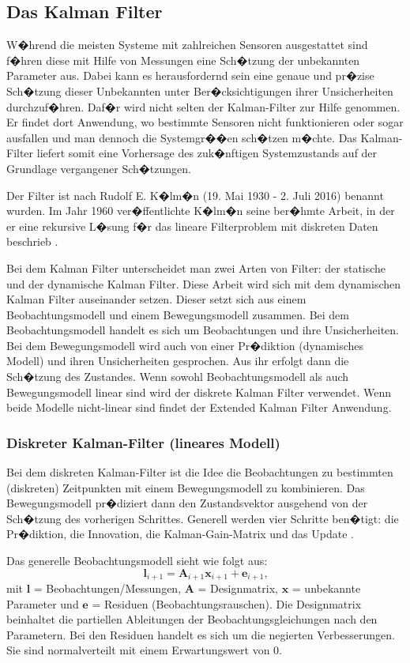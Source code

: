 \subsection{Das Kalman Filter}
W�hrend die meisten Systeme mit zahlreichen Sensoren ausgestattet sind f�hren diese mit Hilfe von Messungen eine Sch�tzung der unbekannten Parameter aus. Dabei kann es herausfordernd sein eine genaue und pr�zise Sch�tzung dieser Unbekannten unter Ber�cksichtigungen ihrer Unsicherheiten durchzuf�hren. Daf�r wird nicht selten der Kalman-Filter zur Hilfe genommen. Er findet dort Anwendung, wo bestimmte Sensoren nicht funktionieren oder sogar ausfallen und man dennoch die Systemgr��en sch�tzen m�chte. Das Kalman-Filter liefert somit eine Vorhersage des zuk�nftigen Systemzustands auf der Grundlage vergangener Sch�tzungen.

Der Filter ist nach Rudolf E. K�lm�n (19. Mai 1930 - 2. Juli 2016) benannt wurden. Im Jahr 1960 ver�ffentlichte K�lm�n seine ber�hmte Arbeit, in der er eine rekursive L�sung f�r das lineare Filterproblem mit diskreten Daten beschrieb \parencite{kalman}.

Bei dem Kalman Filter unterscheidet man zwei Arten von Filter: der statische und der dynamische Kalman Filter. Diese Arbeit wird sich mit dem dynamischen Kalman Filter auseinander setzen. Dieser setzt sich aus einem Beobachtungsmodell und einem Bewegungsmodell zusammen. Bei dem Beobachtungsmodell handelt es sich um Beobachtungen und ihre Unsicherheiten. Bei dem Bewegungsmodell wird auch von einer Pr�diktion (dynamisches Modell) und ihren Unsicherheiten gesprochen. Aus ihr erfolgt dann die Sch�tzung des Zustandes. Wenn sowohl Beobachtungsmodell als auch Bewegungsmodell linear sind wird der diskrete Kalman Filter verwendet. Wenn beide Modelle nicht-linear sind findet der Extended Kalman Filter Anwendung. 

\subsubsection{Diskreter Kalman-Filter (lineares Modell)}\label{subsub_diskret}
Bei dem diskreten Kalman-Filter ist die Idee die Beobachtungen zu bestimmten (diskreten) Zeitpunkten mit einem Bewegungsmodell zu kombinieren. Das Bewegungsmodell pr�diziert dann den Zustandsvektor ausgehend von der Sch�tzung des vorherigen Schrittes. Generell werden vier Schritte ben�tigt: die Pr�diktion, die Innovation, die Kalman-Gain-Matrix und das Update \parencite{teil1}. 

Das generelle Beobachtungsmodell sieht wie folgt aus:
\begin{equation}
\boldsymbol{l}_{i+1} = \boldsymbol{A}_{i+1}\boldsymbol{x}_{i+1} + \boldsymbol{e}_{i+1} \text{,}
\end{equation}
mit $\boldsymbol{l}$ = Beobachtungen/Messungen, $\boldsymbol{A}$ = Designmatrix, $\boldsymbol{x}$ = unbekannte Parameter und $\boldsymbol{e}$ = Residuen (Beobachtungsrauschen). Die Designmatrix beinhaltet die partiellen Ableitungen der Beobachtungsgleichungen nach den Parametern. Bei den Residuen handelt es sich um die negierten Verbesserungen. Sie sind normalverteilt mit einem Erwartungswert von 0. 

